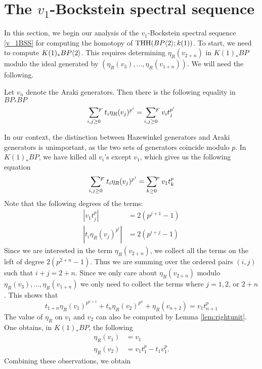 
\section{The $v_1$-Bockstein spectral sequence}
In this section, we begin our analysis of the $v_1$-Bockstein spectral sequence \eqref{v_1BSS} for computing the homotopy of $\operatorname{THH}(BP\langle 2 \rangle;k(1))$.
To start, we need to compute $K(1)_*BP\langle 2 \rangle$. This requires determining $\eta_R(v_{2+n})$ in $K(1)_*BP$ modulo the ideal generated by $(\eta_R(v_3), \ldots, \eta_R(v_{1+n}))$. We will need the following. 

\begin{lem}\label{lem:rightunit}{\cite[Lemma A.2.2.5]{greenbook}} Let $v_n$ denote the Araki generators. Then there is the following equality in $BP_*BP$
\[
\sum_{i,j\geq 0}\hspace{-5pt}\mbox{}^F\: t_i\eta_R(v_j)^{p^i}=\sum_{i,j\geq 0}\hspace{-5pt}\mbox{}^F\:v_it_j^{p^i}
\]
\end{lem}

In our context, the distinction between Hazewinkel generators and Araki generators is unimportant, as the two sets of generators coincide modulo $p$. In $K(1)_*BP$, we have killed all $v_i$'s except $v_1$, which gives us the following equation
\[
\sum_{i,j\geq 0}\hspace{-5pt}\mbox{}^F\: t_i\eta_R(v_j)^{p^i}=\sum_{k\geq 0}\hspace{-4pt}\mbox{}^F\:v_1t_k^{p}
\]
Note that the following degrees of the terms:
\begin{align*}
	|v_1t_j^p|&= 2(p^{j+1}-1)\\
	|t_i\eta_R(v_j)^{p^i}|&= 2(p^{i+j}-1)
\end{align*}
Since we are interested in the term $\eta_R(v_{2+n})$, we collect all the terms on the left of degree $2(p^{2+n}-1)$. Thus we are summing over the ordered pairs $(i,j)$ such that $i+j=2+n$. Since we only care about $\eta_R(v_{2+n})$ modulo $\eta_R(v_3), \ldots, \eta_R(v_{1+n})$ we only need to collect the terms where $j=1, 2$, or $2+n$. This shows that 
\[
t_{1+n}\eta_R(v_1)^{p^{n+1}}+t_n\eta_R(v_2)^{p^n}+\eta_R(v_{n+2})=v_1t_{n+1}^p
\]
The value of $\eta_R$ on $v_1$ and $v_2$ can also be computed by Lemma \ref{lem:rightunit}. One obtains, in $K(1)_*BP$, the following
\begin{align*}
\eta_R(v_1)&=v_1\\
\eta_R(v_2)&=v_1t_1^p-t_1v_1^p.
\end{align*}
Combining these observations, we obtain

